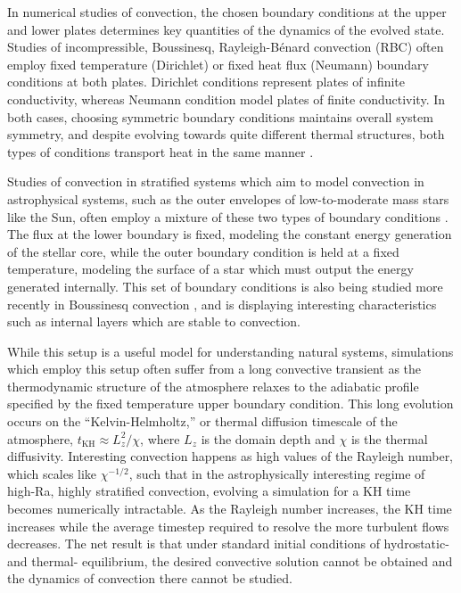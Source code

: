 \documentclass[aps, pre, onecolumn, nofootinbib, notitlepage, groupedaddress, amsfonts, amssymb, amsmath, longbibliography]{revtex4-1}
\newcommand{\RB}{Rayleigh-B\'{e}nard }
\begin{document}
In numerical studies of convection, the chosen boundary conditions at the upper and lower plates
determines key quantities of the dynamics of the evolved state.
Studies of incompressible, Boussinesq, \RB convection (RBC) often
employ fixed temperature (Dirichlet) or fixed heat flux
(Neumann) boundary conditions at both plates.  
Dirichlet conditions represent plates of infinite conductivity,
whereas Neumann condition model plates of finite conductivity.  
In both cases, choosing symmetric boundary conditions maintains overall system symmetry, 
and despite evolving towards quite different thermal structures, both types of conditions
transport heat in the same manner \cite{johnston&doering2009}.

Studies of convection in stratified systems which aim to model convection 
in astrophysical systems, such as the outer envelopes of low-to-moderate mass stars 
like the Sun, often employ a mixture of these
two types of boundary conditions \cite{hurlburt&all1984, cattaneo&all1991}.  
The flux at the lower boundary is fixed, modeling
the constant energy generation of the stellar core, 
while the outer boundary condition is held at a fixed temperature,
modeling the surface of a star which must output the energy generated internally.
This set of boundary conditions is also being studied more recently in Boussinesq convection
\cite{korre&all2017}, and is displaying interesting characteristics such as internal layers which
are stable to convection.

While this setup is a useful model for understanding natural
systems, simulations which employ this setup often suffer from a long convective transient as the thermodynamic structure
of the atmosphere relaxes to the adiabatic profile specified by the fixed temperature upper boundary condition.
This long evolution occurs on the ``Kelvin-Helmholtz,'' or thermal diffusion timescale of the atmosphere, 
$t_{\text{KH}} \approx L_z^2 / \chi$, where $L_z$ is the domain depth and $\chi$ is the thermal diffusivity.
Interesting convection happens as high values of the Rayleigh number, which scales like $\chi^{-1/2}$, such that
in the astrophysically interesting regime of high-Ra, highly stratified convection, evolving a simulation for a
KH time becomes numerically intractable.  As the Rayleigh number increases, the KH time increases while the average
timestep required to resolve the more turbulent flows decreases.  The net result is that under standard initial conditions
of hydrostatic- and thermal- equilibrium, the desired convective solution cannot be obtained and the dynamics of convection
there cannot be studied.
\end{document}
